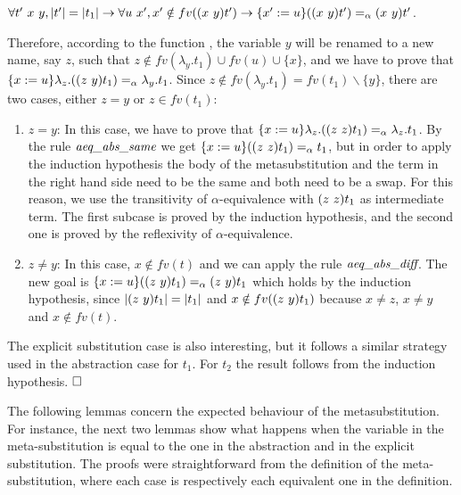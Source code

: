 $\forall t'\ x\ y, |t'| = |t_1| \to \forall u\ x', x' \notin fv(\swap{x}{y}{t'}) \to \metasub{(\swap{x}{y}{t'})}{x'}{u} =_\alpha \swap{x}{y}{t'}$.
\begin{coqdoccode}
\end{coqdoccode}
Therefore, according to the function , the variable $y$ will be renamed to a new name, say $z$, such that $z \notin fv(\lambda_y.t_1) \cup fv(u) \cup \{x\}$, and we have to prove that $\metasub{\lambda_z.(\swap{z}{y}{t_1})}{x}{u} =_\alpha \lambda_y.t_1$. Since $z \notin fv(\lambda_y.t_1) = fv(t_1)\backslash \{y\}$, there are two cases, either $z = y$ or $z \in fv(t_1)$:
\begin{coqdoccode}
\end{coqdoccode}
\begin{enumerate}
   \item $z = y$: In this case, we have to prove that $\metasub{\lambda_z.(\swap{z}{z}{t_1})}{x}{u} =_\alpha \lambda_z.t_1$. By the rule $\mbox{\it aeq}\_\mbox{\it abs}\_\mbox{\it same}$ we get $\metasub{(\swap{z}{z}{t_1})}{x}{u} =_\alpha t_1$, but in order to apply the induction hypothesis the body of the metasubstitution and the term in the right hand side need to be the same and both need to be a swap. For this reason, we use the transitivity of $\alpha$-equivalence with $\swap{z}{z}{t_1}$ as intermediate term. The first subcase is proved by the induction hypothesis, and the second one is proved by the reflexivity of $\alpha$-equivalence.
\item $z \neq y$: In this case, $x \notin fv(t)$ and we can apply the rule $\mbox{\it aeq}\_\mbox{\it abs}\_\mbox{\it diff}$. The new goal is $\metasub{(\swap{z}{y}{t_1})}{x}{u} =_\alpha \swap{z}{y}{t_1}$ which holds by the induction hypothesis, since $|\swap{z}{y}{t_1}| = |t_1|$ and $x \notin fv(\swap{z}{y}{t_1})$ because $x \neq z$, $x \neq y$ and $x \notin fv(t)$.
  \end{enumerate}
\begin{coqdoccode}
\end{coqdoccode}
The explicit substitution case is also interesting, but it follows a similar strategy used in the abstraction case for $t_1$. For $t_2$ the result follows from the induction hypothesis. $\hfill\Box$ 
\begin{coqdoccode}
\coqdocemptyline
\coqdocemptyline
\end{coqdoccode}
The following lemmas concern the expected behaviour of the metasubstitution. For instance, the next two lemmas show what happens when the variable in the meta-substitution is equal to the one in the abstraction and in the explicit substitution.  The proofs were straightforward from the definition of the meta-substitution, where each case is respectively each equivalent one in the definition. \newline
